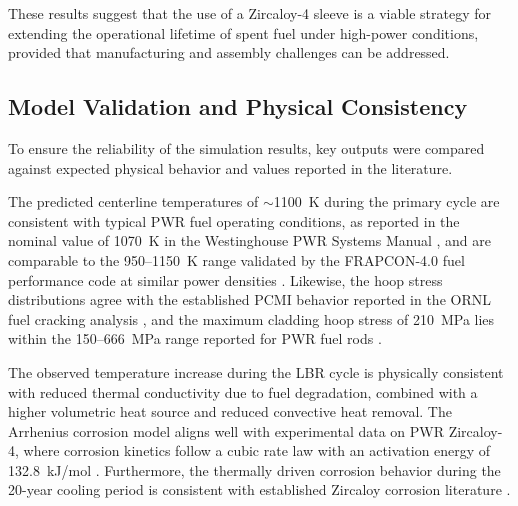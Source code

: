 These results suggest that the use of a Zircaloy-4 sleeve is a viable strategy for extending the operational lifetime of spent fuel under high-power conditions, provided that manufacturing and assembly challenges can be addressed.



\subsection{Model Validation and Physical Consistency}

To ensure the reliability of the simulation results, key outputs were compared against expected physical behavior and values reported in the literature.

The predicted centerline temperatures of $\sim$1100~K during the primary cycle are consistent with typical PWR fuel operating conditions, as reported in the nominal value of 1070~K in the Westinghouse PWR Systems Manual \cite{WestinghouseLimits}, %
 and are comparable to the 950--1150~K range validated by the FRAPCON-4.0 fuel performance code at similar power densities %
 \cite{2015FRAPCON-4.0Assessment.}. Likewise, the hoop stress distributions agree with the established PCMI behavior reported in the ORNL fuel cracking analysis \cite{Sweet2018AnalysisRelocation}, %
  and the maximum cladding hoop stress of 210~MPa lies within the 150--666~MPa range reported for PWR fuel rods \cite{Qi2020Pellet-claddingCladding}.%

The observed temperature increase during the LBR cycle is physically consistent with reduced thermal conductivity due to fuel degradation, combined with a higher volumetric heat source and reduced convective heat removal. The Arrhenius corrosion model aligns well with experimental data on PWR Zircaloy-4, where corrosion kinetics follow a cubic rate law with an activation energy of 132.8~kJ/mol \cite{osti_23002966}. %
 Furthermore, the thermally driven corrosion behavior during the 20-year cooling period is consistent with established Zircaloy corrosion literature \cite{Motta2015CorrosionCladding}. %

